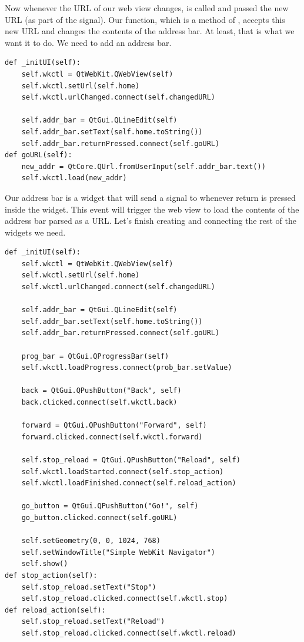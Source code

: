 Now whenever the URL of our web view changes,  is called and passed the new URL (as part of the signal).
Our function, which is a method of , accepts this new URL and changes the contents of the address bar.
At least, that is what we want it to do.
We need to add an address bar.
\begin{lstlisting}
def _initUI(self):
    self.wkctl = QtWebKit.QWebView(self)
    self.wkctl.setUrl(self.home)
    self.wkctl.urlChanged.connect(self.changedURL)
    
    self.addr_bar = QtGui.QLineEdit(self)
    self.addr_bar.setText(self.home.toString())
    self.addr_bar.returnPressed.connect(self.goURL)
def goURL(self):
    new_addr = QtCore.QUrl.fromUserInput(self.addr_bar.text())
    self.wkctl.load(new_addr)
\end{lstlisting}
Our address bar is a  widget that will send a signal to  whenever return is pressed inside the widget.
This event will trigger the web view to load the contents of the address bar parsed as a URL.
Let's finish creating and connecting the rest of the widgets we need.
\begin{lstlisting}
def _initUI(self):
    self.wkctl = QtWebKit.QWebView(self)
    self.wkctl.setUrl(self.home)
    self.wkctl.urlChanged.connect(self.changedURL)
    
    self.addr_bar = QtGui.QLineEdit(self)
    self.addr_bar.setText(self.home.toString())
    self.addr_bar.returnPressed.connect(self.goURL)
    
    prog_bar = QtGui.QProgressBar(self)
    self.wkctl.loadProgress.connect(prob_bar.setValue)
    
    back = QtGui.QPushButton("Back", self)
    back.clicked.connect(self.wkctl.back)
    
    forward = QtGui.QPushButton("Forward", self)
    forward.clicked.connect(self.wkctl.forward)
    
    self.stop_reload = QtGui.QPushButton("Reload", self)
    self.wkctl.loadStarted.connect(self.stop_action)
    self.wkctl.loadFinished.connect(self.reload_action)
    
    go_button = QtGui.QPushButton("Go!", self)
    go_button.clicked.connect(self.goURL)
    
    self.setGeometry(0, 0, 1024, 768)
    self.setWindowTitle("Simple WebKit Navigator")
    self.show()
def stop_action(self):
    self.stop_reload.setText("Stop")
    self.stop_reload.clicked.connect(self.wkctl.stop)
def reload_action(self):
    self.stop_reload.setText("Reload")
    self.stop_reload.clicked.connect(self.wkctl.reload)
\end{lstlisting}
